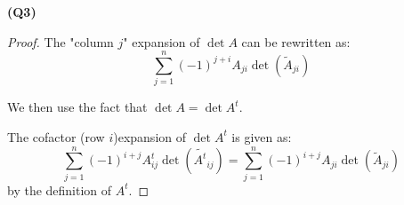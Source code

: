 \documentclass[12pt, a4paper]{article}
\begin{document}
\textbf{(Q3)}
\begin{proof}
    The "column $j$" expansion of $\det A$ can be rewritten as:
    \[
        \sum_{j = 1}^n (-1)^{j + i} A_{ji} \det(\tilde{A}_{ji})
    \]

    We then use the fact that $\det A = \det A^t$.

    The cofactor (row $i$)expansion of $\det A^t$ is given as:
    \[
        \sum_{j = 1}^{n} (-1)^{i + j} A^{t}_{ij} \det (\tilde{A^t}_{ij})
        =
        \sum_{j = 1}^{n} (-1)^{i + j} A_{ji} \det (\tilde{A}_{ji})
    \]
    by the definition of $A^t$.
\end{proof}
\end{document}
